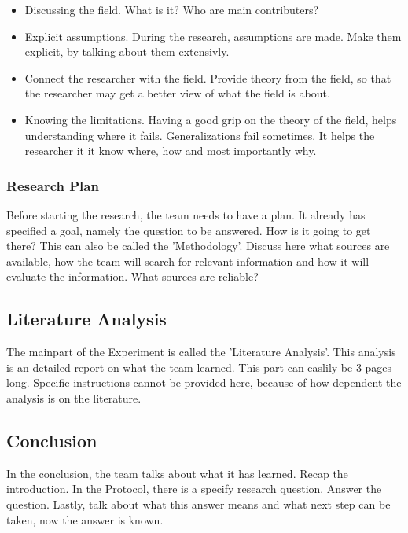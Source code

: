 \documentclass[10pt]{report}
\begin{document}
\begin{itemize}
	\item Discussing the field. What is it? Who are main contributers?
	\item Explicit assumptions. During the research, assumptions are made. Make them explicit, by talking about them extensivly.
	\item Connect the researcher with the field. Provide theory from the field, so that the researcher may get a better view of what the field is about.
	\item Knowing the limitations. Having a good grip on the theory of the field, helps understanding where it fails. Generalizations fail sometimes. It helps the researcher it it know where, how and most importantly why.
\end{itemize}

\subsubsection{Research Plan}

Before starting the research, the team needs to have a plan. It already has specified a goal, namely the question to be answered. How is it going to get there? This can also be called the 'Methodology'. Discuss here what sources are available, how the team will search for relevant information and how it will evaluate the information. What sources are reliable?

\subsection{Literature Analysis}

The mainpart of the Experiment is called the 'Literature Analysis'. This analysis is an detailed report on what the team learned. This part can easlily be 3 pages long. Specific instructions cannot be provided here, because of how dependent the analysis is on the literature.

\subsection{Conclusion}

In the conclusion, the team talks about what it has learned. Recap the introduction. In the Protocol, there is a specify research question. Answer the question. Lastly, talk about what this answer means and what next step can be taken, now the answer is known.

\newpage
\end{document}

